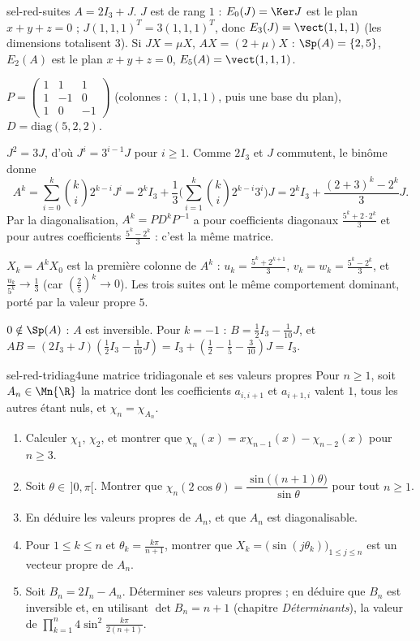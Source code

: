 \begin{corrige}{sel-red-suites}
 $A=2I_3+J$. $J$ est de rang $1$ : $E_0(J)=\Ker J$ est le plan $x+y+z=0$ ; $J(1,1,1)^T=3(1,1,1)^T$, donc $E_3(J)=\vect(1,1,1)$
(les dimensions totalisent $3$). Si $JX=\mu X$, $AX=(2+\mu)X$ : $\Sp(A)=\{2,5\}$, $E_2(A)$ est le plan $x+y+z=0$, $E_5(A)=\vect(1,1,1)$.

 $P=\begin{pmatrix}1&1&1\\1&-1&0\\1&0&-1\end{pmatrix}$ (colonnes : $(1,1,1)$, puis une base du plan), $D=\mathrm{diag}(5,2,2)$.

 $J^2=3J$, d'où $J^i=3^{i-1}J$ pour $i\geq1$. Comme $2I_3$ et $J$ commutent, le binôme donne
\[A^k=\sum_{i=0}^k\binom ki2^{k-i}J^i=2^kI_3+\frac13\Big(\sum_{i=1}^k\binom ki2^{k-i}3^i\Big)J=2^kI_3+\frac{(2+3)^k-2^k}3J.\]
Par la diagonalisation, $A^k=PD^kP^{-1}$ a pour coefficients diagonaux $\frac{5^k+2\cdot2^k}3$ et pour autres coefficients
$\frac{5^k-2^k}3$ : c'est la même matrice.

 $X_k=A^kX_0$ est la première colonne de $A^k$ : $u_k=\frac{5^k+2^{k+1}}3$, $v_k=w_k=\frac{5^k-2^k}3$, et
$\frac{u_k}{5^k}\to\frac13$ (car $\left(\frac25\right)^k\to0$). Les trois suites ont le même comportement dominant, porté par la
valeur propre $5$.

 $0\notin\Sp(A)$ : $A$ est inversible. Pour $k=-1$ : $B=\frac12I_3-\frac1{10}J$, et
$AB=(2I_3+J)\left(\frac12I_3-\frac1{10}J\right)=I_3+\left(\frac12-\frac15-\frac3{10}\right)J=I_3$.
\end{corrige}

\begin{exo}{sel-red-tridiag}{4}{une matrice tridiagonale et ses valeurs propres}
Pour $n\geq1$, soit $A_n\in\Mn{\R}$ la matrice dont les coefficients $a_{i,i+1}$ et $a_{i+1,i}$ valent $1$, tous les autres étant nuls,
et $\chi_n=\chi_{A_n}$.
\begin{enumerate}
\item Calculer $\chi_1$, $\chi_2$, et montrer que $\chi_n(x)=x\chi_{n-1}(x)-\chi_{n-2}(x)$ pour $n\geq3$.
\item Soit $\theta\in\,]0,\pi[$. Montrer que $\chi_n(2\cos\theta)=\dfrac{\sin\big((n+1)\theta\big)}{\sin\theta}$ pour tout $n\geq1$.
\item En déduire les valeurs propres de $A_n$, et que $A_n$ est diagonalisable.
\item Pour $1\leq k\leq n$ et $\theta_k=\frac{k\pi}{n+1}$, montrer que $X_k=\big(\sin(j\theta_k)\big)_{1\leq j\leq n}$ est un vecteur propre de $A_n$.
\item Soit $B_n=2I_n-A_n$. Déterminer ses valeurs propres ; en déduire que $B_n$ est inversible et, en utilisant $\det B_n=n+1$ (chapitre
\emph{Déterminants}), la valeur de $\displaystyle\prod_{k=1}^n4\sin^2\frac{k\pi}{2(n+1)}$.
\end{enumerate}
\end{exo}

